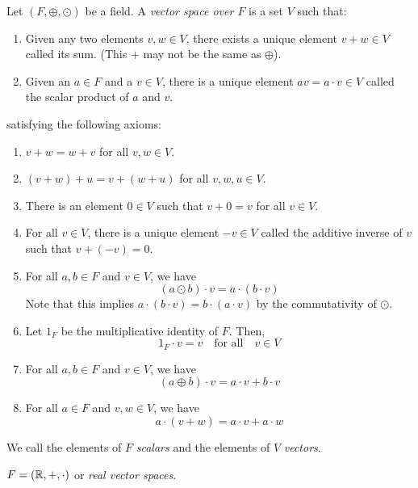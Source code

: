 \begin{defn}[] \label{defn:}
    Let $(F, \oplus, \odot)$ be a field. A \emph{vector space over $F$} is a set $V$ such that:
    \begin{enumerate}[label=(\alph*)]
        \item Given any two elements $v, w \in V$, there exists a unique element $v + w \in V$ called its sum.
        (This $+$ may not be the same as $\oplus$).
        \item Given an $a \in F$ and a $v \in V$, there is a unique element $av = a \cdot v \in V$ called the scalar product of $a$ and $v$.
    \end{enumerate}
    satisfying the following axioms:
    \begin{enumerate}[label=(V\arabic*)]
        \item $v + w = w + v$ for all $v, w \in V$.
        \item $(v + w) + u = v + (w + u)$ for all $v, w, u \in V$.
        \item There is an element $0 \in V$ such that $v + 0 = v$ for all $v \in V$.
        \item For all $v \in V$, there is a unique element $-v \in V$ called the additive inverse of $v$ such that $v + (-v) = 0$.
        \item For all $a, b \in F$ and $v \in V$, we have \[
            (a \odot b) \cdot v = a \cdot (b \cdot v)
        \] Note that this implies $a \cdot (b \cdot v) = b \cdot (a \cdot v)$ by the commutativity of $\odot$.
        \item Let $1_{F}$ be the multiplicative identity of $F$. Then, \[
            1_{F} \cdot v = v \quad\text{for all}\quad v \in V
        \]
        \item For all $a, b \in F$ and $v \in V$, we have \[
            (a \oplus b) \cdot v = a \cdot v + b \cdot v
        \]
        \item For all $a \in F$ and $v, w \in V$, we have \[
            a \cdot (v + w) = a \cdot v + a \cdot w
        \]
    \end{enumerate}
    We call the elements of $F$ \emph{scalars} and the elements of $V$ \emph{vectors}.
\end{defn}
\begin{example}
    $F = (\mathbb{R}, +, \cdot)$ or \emph{real vector spaces}.
\end{example}

